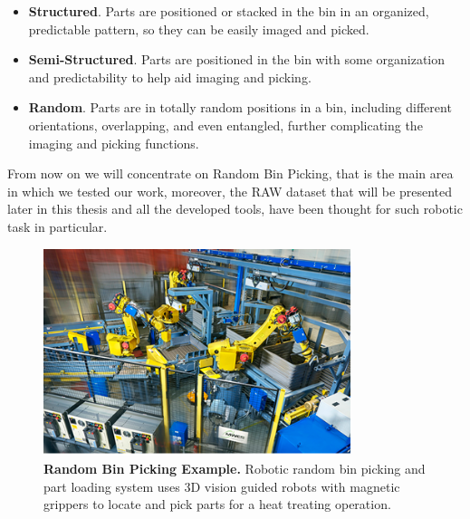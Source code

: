 \begin{itemize}
	\item \textbf{Structured}. Parts are positioned or stacked in the bin in an organized, predictable pattern, so they can be easily imaged and picked.
	\item \textbf{Semi-Structured}. Parts are positioned in the bin with some organization and predictability to help aid imaging and picking.
	\item \textbf{Random}. Parts are in totally random positions in a bin, including different orientations, overlapping, and even entangled, further complicating the imaging and picking functions.
\end{itemize}

From now on we will concentrate on Random Bin Picking, that is the main area in which we tested our work, moreover, the RAW dataset that will be presented later in this thesis and all the developed tools, have been thought for such robotic task in particular.

\begin{figure}
    \centering
    \includegraphics[width=0.8\textwidth]{figures/1_perception_and_sensing_in_robotics/rbp_example}
    \caption{\textbf{Random Bin Picking Example.} Robotic random bin picking and part loading system uses 3D vision guided robots with magnetic grippers to locate and pick parts for a heat treating operation.} 
    \label{fig:rbp_example}
\end{figure}

